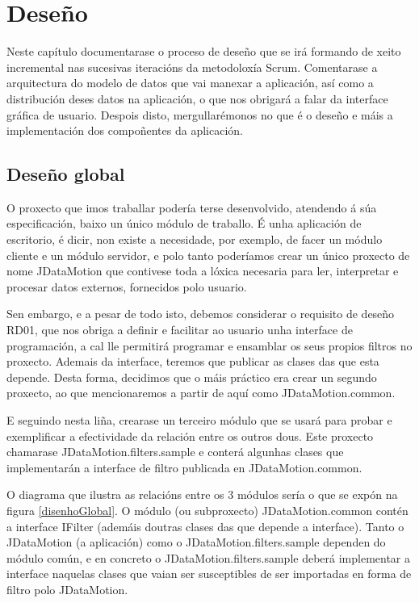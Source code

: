 \chapter{Deseño}

Neste capítulo documentarase o proceso de deseño que se irá formando de xeito incremental nas sucesivas iteracións da metodoloxía Scrum. Comentarase a arquitectura do modelo de datos que vai manexar a aplicación, así como a distribución deses datos na aplicación, o que nos obrigará a falar da interface gráfica de usuario. Despois disto, mergullarémonos no que é o deseño e máis a implementación dos compoñentes da aplicación.

\section{Deseño global}

O proxecto que imos traballar podería terse desenvolvido, atendendo á súa especificación, baixo un único módulo de traballo. É unha aplicación de escritorio, é dicir, non existe a necesidade, por exemplo, de facer un módulo cliente e un módulo servidor, e polo tanto poderíamos crear un único proxecto de nome JDataMotion que contivese toda a lóxica necesaria para ler, interpretar e procesar datos externos, fornecidos polo usuario.

Sen embargo, e a pesar de todo isto, debemos considerar o requisito de deseño RD01, que nos obriga a definir e facilitar ao usuario unha interface de programación, a cal lle permitirá programar e ensamblar os seus propios filtros no proxecto. Ademais da interface, teremos que publicar as clases das que esta depende. Desta forma, decidimos que o máis práctico era crear un segundo proxecto, ao que mencionaremos a partir de aquí como JDataMotion.common.

E seguindo nesta liña, crearase un terceiro módulo que se usará para probar e exemplificar a efectividade da relación entre os outros dous. Este proxecto chamarase JDataMotion.filters.sample e conterá algunhas clases que implementarán a interface de filtro publicada en JDataMotion.common.

O diagrama que ilustra as relacións entre os 3 módulos sería o que se expón na figura \ref{disenhoGlobal}. O módulo (ou subproxecto) JDataMotion.common contén a interface IFilter (ademáis doutras clases das que depende a interface). Tanto o JDataMotion (a aplicación) como o JDataMotion.filters.sample dependen do módulo común, e en concreto o JDataMotion.filters.sample deberá implementar a interface naquelas clases que vaian ser susceptibles de ser importadas en forma de filtro polo JDataMotion.

